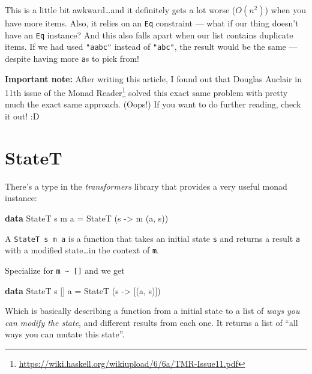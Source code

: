 \documentclass[]{article}
\newenvironment{Shaded}{}{}
\newcommand{\DataTypeTok}[1]{\textcolor[rgb]{0.56,0.13,0.00}{#1}}
\newcommand{\KeywordTok}[1]{\textcolor[rgb]{0.00,0.44,0.13}{\textbf{#1}}}
\newcommand{\NormalTok}[1]{#1}
\newcommand{\OtherTok}[1]{\textcolor[rgb]{0.00,0.44,0.13}{#1}}
\renewcommand{\href}[2]{#2\footnote{\url{#1}}}
\begin{document}
This is a little bit awkward\ldots and it definitely gets a lot worse
(\(O(n^2)\)) when you have more items. Also, it relies on an \texttt{Eq}
constraint --- what if our thing doesn't have an \texttt{Eq} instance? And this
also falls apart when our list contains duplicate items. If we had used
\texttt{"aabc"} instead of \texttt{"abc"}, the result would be the same ---
despite having more \texttt{\textquotesingle{}a\textquotesingle{}}s to pick
from!

\textbf{Important note:} After writing this article, I found out that Douglas
Auclair in \href{https://wiki.haskell.org/wikiupload/6/6a/TMR-Issue11.pdf}{11th
issue of the Monad Reader} solved this exact same problem with pretty much the
exact same approach. (Oops!) If you want to do further reading, check it out! :D

\hypertarget{statet}{%
\section{StateT}\label{statet}}

There's a type in the \emph{transformers} library that provides a very useful
monad instance:

\begin{Shaded}
\begin{Highlighting}[]
\KeywordTok{data} \DataTypeTok{StateT}\NormalTok{ s m a }\OtherTok{=} \DataTypeTok{StateT}\NormalTok{ (s }\OtherTok{{-}>}\NormalTok{ m (a, s))}
\end{Highlighting}
\end{Shaded}

A \texttt{StateT\ s\ m\ a} is a function that takes an initial state \texttt{s}
and returns a result \texttt{a} with a modified state\ldots in the context of
\texttt{m}.

Specialize for \texttt{m\ \textasciitilde{}\ {[}{]}} and we get

\begin{Shaded}
\begin{Highlighting}[]
\KeywordTok{data} \DataTypeTok{StateT}\NormalTok{ s [] a }\OtherTok{=} \DataTypeTok{StateT}\NormalTok{ (s }\OtherTok{{-}>}\NormalTok{ [(a, s)])}
\end{Highlighting}
\end{Shaded}

Which is basically describing a function from a initial state to a list of
\emph{ways you can modify the state}, and different results from each one. It
returns a list of ``all ways you can mutate this state''.
\end{document}
